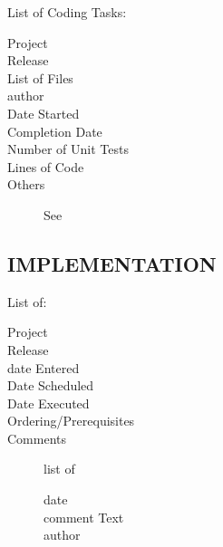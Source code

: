 \documentclass[SDSUThesis.tex]{subfiles}
\begin{document}
    List of Coding Tasks:
    \begin{description}
      \item[Project] 
      \item[Release]
      \item[List of Files]
      \item[author]
      \item[Date Started]
      \item[Completion Date]
      \item[Number of Unit Tests]
      \item[Lines of Code]
      \item[Others] See \cite{Jones2009, Jones2012, Rubin2007, Snipes2013}
    \end{description}
    
    \subsection{IMPLEMENTATION}
    
    List of:
    \begin{description}
      \item[Project] 
      \item[Release]
      \item[date Entered]
      \item[Date Scheduled]
      \item[Date Executed]
      \item[Ordering/Prerequisites]
      \item[Comments] list of \\
      \begin{description}
        \item[date]
        \item[comment Text]
        \item[author]
      \end{description}
    \end{description}
\end{document}
